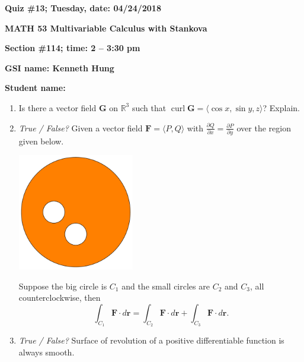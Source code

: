 \documentclass{article}
\newcommand{\rr}{\mathbf{r}}
\DeclareMathOperator{\curl}{curl}
\begin{document}
{\bf Quiz \#13; Tuesday, date: 04/24/2018}

{\bf MATH 53 Multivariable Calculus with Stankova}

{\bf Section \#114; time: 2 -- 3:30 pm}

{\bf GSI name: Kenneth Hung}

{\bf Student name:}

\vspace*{0.25in}

\begin{enumerate}
\item Is there a vector field $\mathbf{G}$ on $\mathbb{R}^3$ such that $\curl \mathbf{G} = \langle \cos x, \sin y, z \rangle$? Explain.

\item {\em True / False?} Given a vector field $\mathbf{F} = \langle P, Q \rangle$ with $\frac{\partial Q}{\partial x} = \frac{\partial P}{\partial y}$ over the region given below.
\begin{center}
\includegraphics[width=0.4\textwidth]{quiz13dis114pic}
\end{center}
Suppose the big circle is $C_1$ and the small circles are $C_2$ and $C_3$, all counterclockwise, then
\[
\int_{C_1} \mathbf{F} \cdot d\rr = \int_{C_2} \mathbf{F} \cdot d\rr + \int_{C_3} \mathbf{F} \cdot d\rr.
\]

\item {\em True / False?} Surface of revolution of a positive differentiable function is always smooth.
\end{enumerate}
\end{document}
